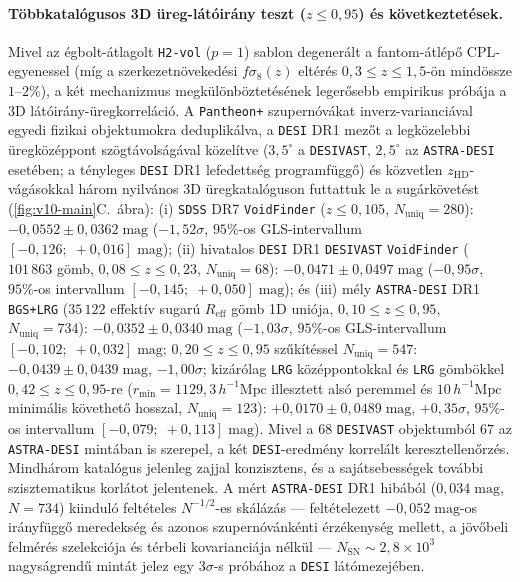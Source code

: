 \documentclass[11pt,a4paper]{article}
\begin{document}
\paragraph{T\"obbkatal\'ogusos 3D \"ureg-l\'at\'oir\'any teszt ($z \le 0{,}95$) \'es k\"ovetkeztet\'esek.} Mivel az \'egbolt-\'atlagolt \texttt{H2-vol} ($p=1$) sablon degener\'alt a fantom-\'atl\'ep\H{o} CPL-egyenessel (m\'ig a szerkezetn\"oveked\'esi $f\sigma_8(z)$ elt\'er\'es $0{,}3 \le z \le 1{,}5$-\"on mind\"ossze $1\text{--}2\%$), a k\'et mechanizmus megk\"ul\"onb\"oztet\'es\'enek leger\H{o}sebb empirikus pr\'ob\'aja a 3D l\'at\'oir\'any-\"uregkorrel\'aci\'o. A \texttt{Pantheon+} szupern\'ov\'akat inverz-varianci\'aval egyedi fizikai objektumokra deduplik\'alva, a \texttt{DESI} DR1 mez\H{o}t a legk\"ozelebbi \"uregk\"oz\'eppont sz\"ogt\'avols\'ag\'aval k\"ozel\'itve ($3{,}5^\circ$ a \texttt{DESIVAST}, $2{,}5^\circ$ az \texttt{ASTRA-DESI} eset\'eben; a t\'enyleges \texttt{DESI} DR1 lefedetts\'eg programf\"ugg\H{o}) \'es k\"ozvetlen $z_{\mathrm{HD}}$-v\'ag\'asokkal h\'arom nyilv\'anos 3D \"uregkatal\'oguson futtattuk le a sug\'ark\"ovet\'est (\ref{fig:v10-main}C.\ \'abra): (i) \texttt{SDSS} DR7 \texttt{VoidFinder} \cite{Douglass2023ApJS} ($z \le 0{,}105$, $N_{\mathrm{uniq}} = 280$): $-0{,}0552 \pm 0{,}0362\;\mathrm{mag}$ ($-1{,}52\sigma$, $95\%$-os GLS-intervallum $[-0{,}126;\;+0{,}016]\;\mathrm{mag}$); (ii) hivatalos \texttt{DESI} DR1 \texttt{DESIVAST} \texttt{VoidFinder} \cite{DESIVAST2025} ($101\,863$ g\"omb, $0{,}08 \le z \le 0{,}23$, $N_{\mathrm{uniq}} = 68$): $-0{,}0471 \pm 0{,}0497\;\mathrm{mag}$ ($-0{,}95\sigma$, $95\%$-os intervallum $[-0{,}145;\;+0{,}050]\;\mathrm{mag}$); \'es (iii) m\'ely \texttt{ASTRA-DESI} DR1 \texttt{BGS+LRG} \cite{ASTRADESI2025} ($35\,122$ effekt\'iv sugar\'u $R_{\mathrm{eff}}$ g\"omb 1D uni\'oja, $0{,}10 \le z \le 0{,}95$, $N_{\mathrm{uniq}} = 734$): $-0{,}0352 \pm 0{,}0340\;\mathrm{mag}$ ($-1{,}03\sigma$, $95\%$-os GLS-intervallum $[-0{,}102;\;+0{,}032]\;\mathrm{mag}$; $0{,}20 \le z \le 0{,}95$ sz\H{u}k\'it\'essel $N_{\mathrm{uniq}} = 547$: $-0{,}0439 \pm 0{,}0439\;\mathrm{mag}$, $-1{,}00\sigma$; kiz\'ar\'olag \texttt{LRG} k\"oz\'eppontokkal \'es \texttt{LRG} g\"omb\"okkel $0{,}42 \le z \le 0{,}95$-re ($r_{\min} = 1129{,}3\,h^{-1}\mathrm{Mpc}$ illesztett als\'o peremmel \'es $10\,h^{-1}\mathrm{Mpc}$ minim\'alis k\"ovethet\H{o} hosszal, $N_{\mathrm{uniq}} = 123$): $+0{,}0170 \pm 0{,}0489\;\mathrm{mag}$, $+0{,}35\sigma$, $95\%$-os intervallum $[-0{,}079;\;+0{,}113]\;\mathrm{mag}$). Mivel a $68$ \texttt{DESIVAST} objektumb\'ol $67$ az \texttt{ASTRA-DESI} mint\'aban is szerepel, a k\'et \texttt{DESI}-eredm\'eny korrel\'alt keresztellen\H{o}rz\'es. Mindh\'arom katal\'ogus jelenleg zajjal konzisztens, \'es a saj\'atsebess\'egek \cite{Bolejko2013PRL} tov\'abbi szisztematikus korl\'atot jelentenek. A m\'ert \texttt{ASTRA-DESI} DR1 hib\'ab\'ol ($0{,}034\;\mathrm{mag}$, $N=734$) kiindul\'o felt\'eteles $N^{-1/2}$-es sk\'al\'az\'as --- felt\'etelezett $-0{,}052\;\mathrm{mag}$-os ir\'anyf\"ugg\H{o} meredeks\'eg \'es azonos szupern\'ov\'ank\'enti \'erz\'ekenys\'eg mellett, a j\"ov\H{o}beli felm\'er\'es szelekci\'oja \'es t\'erbeli kovarianci\'aja n\'elk\"ul --- $N_{\mathrm{SN}} \sim 2{,}8 \times 10^3$ nagys\'agrend\H{u} mint\'at jelez egy $3\sigma$-s pr\'ob\'ahoz a \texttt{DESI} l\'at\'omezej\'eben.
\end{document}
